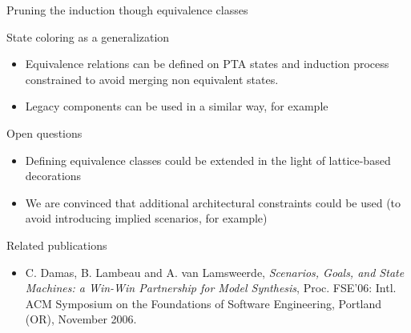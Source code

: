 \begin{frame}{Pruning the induction though equivalence classes}
	\begin{block}{State coloring as a generalization}
		\begin{itemize}
			\item Equivalence relations can be defined on PTA states and induction process constrained to avoid merging
				non equivalent states.
			\item Legacy components can be used in a similar way, for example
		\end{itemize}
	\end{block}
	\begin{block}{Open questions}
		\begin{itemize}
			\item Defining equivalence classes could be extended in the light of lattice-based decorations
			\item We are convinced that additional architectural constraints could be used (to avoid introducing implied scenarios, for example)
		\end{itemize}
	\end{block}
	\begin{block}{Related publications}
   		\scriptsize
		\begin{itemize}
			\item C. Damas, B. Lambeau and A. van Lamsweerde, \emph{Scenarios, Goals, and State Machines: a Win-Win Partnership for Model Synthesis}, 
                                      Proc. FSE'06: Intl. ACM Symposium on the Foundations of Software Engineering, Portland (OR), November 2006. 
		\end{itemize}
	   \end{block}
\end{frame}


